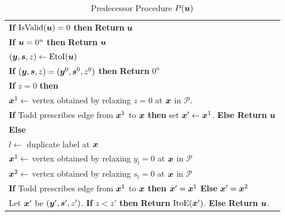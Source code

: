 \documentclass[a4paper,UKenglish]{lipics2}
\theoremstyle{definition}
\def\ite{\mbox{ItoE}}
\def\eti{\mbox{EtoI}}
\def\isvalid{\mbox{IsValid}}
\newcommand{\CPol}{\mbox{${\mathcal P}$}}
\newcommand{\yy}{\mbox{\boldmath $y$}}
\newcommand{\uu}{\mbox{\boldmath $u$}}
\newcommand{\vv}{\mbox{\boldmath $v$}}
\newcommand{\xx}{\mbox{\boldmath $x$}}
\newcommand{\ps}{\mbox{\boldmath $s$}}
\begin{document}
\begin{table}[!htb]
\caption{Predecessor Procedure $P(\uu)$}\label{tab:P}
\begin{tabular}{|l|}
\hline
\hspace{0pt} {\bf If} $\isvalid(\uu)=0$ {\bf then} {\bf Return} $\uu$\\
\hspace{0pt} {\bf If} $\uu=0^n$ {\bf then} {\bf Return} $\uu$\\
\hspace{0pt} $(\yy,\ps,z) \leftarrow \eti(\uu)$\\
\hspace{0pt} {\bf If} $(\yy,\ps,z)=(\yy^0,\ps^0,z^0)$ {\bf then} {\bf Return} $0^n$\\
\hspace{0pt} {\bf If} $z=0$ {\bf then} \\
\hspace{5pt} $\xx^1\leftarrow$ vertex obtained by relaxing $z=0$ at $\xx$ in $\CPol$. \\
\hspace{5pt} {\bf If} Todd \cite{todd1976orientation} prescribes edge from $\xx^1$ to $\xx$ {\bf then} set $\xx'\leftarrow \xx^1$. {\bf Else Return} $\uu$\\
\hspace{0pt} {\bf Else}\\
\hspace{5pt} $l\leftarrow $ duplicate label at $\xx$\\
\hspace{5pt} $\xx^1\leftarrow $ vertex obtained by relaxing $y_l=0$ at $\xx$ in $\CPol$ \\
\hspace{5pt} $\xx^2\leftarrow $ vertex obtained by relaxing $s_l=0$ at $\xx$ in $\CPol$ \\
\hspace{5pt} {\bf If} Todd \cite{todd1976orientation} prescribes edge from $\xx^1$ to $\xx$ {\bf then} $\xx'=\xx^1$ {\bf Else} $\xx'=\xx^2$\\
\hspace{0pt} Let $\xx'$ be $(\yy',\ps',z')$. {\bf If} $z<z'$ {\bf then} {\bf Return} $\ite(\xx')$. {\bf Else} {\bf Return} $\uu$.\\
\hline
\end{tabular}
\end{table}
\end{document}

